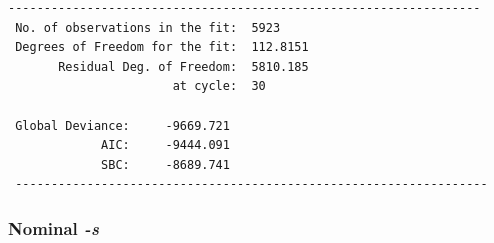 \documentclass[
]{article}
\begin{document}
\begin{verbatim}
------------------------------------------------------------------ 
 No. of observations in the fit:  5923  
 Degrees of Freedom for the fit:  112.8151 
       Residual Deg. of Freedom:  5810.185  
                       at cycle:  30  
   
 Global Deviance:     -9669.721  
             AIC:     -9444.091  
             SBC:     -8689.741  
 ------------------------------------------------------------------ 
\end{verbatim}

\normalsize
\newpage

\hypertarget{nominal--s}{%
\subsubsection{\texorpdfstring{Nominal
\emph{-s}}{Nominal -s}}\label{nominal--s}}

\small
\end{document}
